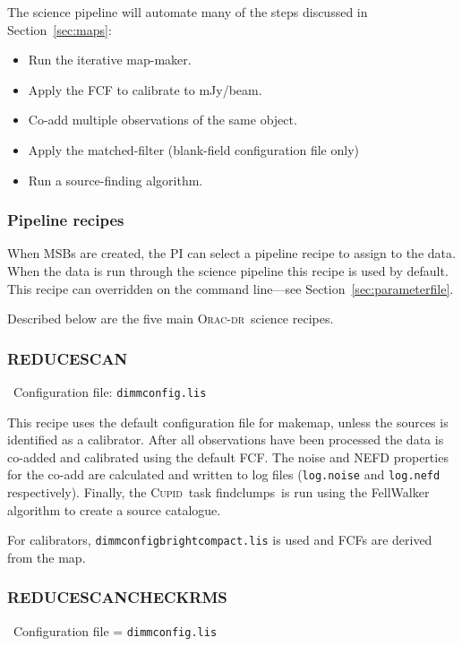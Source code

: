 \documentclass[twoside,11pt]{article}
\newcommand{\htmladdnormallink}[2]{#1}
\newcommand{\htmlref}[2]{#1}
\newcommand{\latexhtml}[2]{#1}
\newcommand{\xref}[3]{#1}
\newcommand{\xlabel}[1]{}
\renewcommand{\_}{\texttt{\symbol{95}}}
\newcommand{\cupid}{\xref{\textsc{Cupid}}{sun255}{}}
\newcommand{\oracdr}{\htmladdnormallink{\textsc{Orac-dr}}{http://www.oracdr.org/oracdr}}
\newcommand{\task}[1]{\textsf{#1}}
\newcommand{\makemap}{\xref{\task{makemap}}{sun258}{MAKEMAP}}
\newcommand{\findclumps}{\xref{\task{findclumps}}{sun255}{FINDCLUMPS}}
\newcommand{\cref}[3]{\latexhtml{#1~\ref{#2}}{\htmlref{#3}{#2}}}
\begin{document}
The science pipeline will automate many of the steps discussed in
\cref{Section}{sec:maps}{Reducing your data}:
\vspace{-0.3cm}
\begin{itemize}\itemsep-0.3em
\item Run the iterative map-maker.
\item Apply the FCF to calibrate to mJy/beam.
\item Co-add multiple observations of the same object.
\item Apply the matched-filter (blank-field configuration file only)
\item Run a source-finding algorithm.
\end{itemize}

\subsubsection{\xlabel{pl_output}Pipeline recipes}
\label{sec:recipes}

When MSBs are created, the PI can select a pipeline recipe to assign
to the data. When the data is run through the science pipeline this
recipe is used by default. This recipe can overridden on the command
line---see \cref{Section}{sec:parameterfile}{Changing the defaults}.

Described below are the five main \oracdr\ science recipes.

\subsubsection{\xlabel{extsources}REDUCE\_SCAN}
\vspace{-0.3cm}
\textbullet\ Configuration file: \texttt{dimmconfig.lis}

This recipe uses the default configuration file for \makemap, unless
the sources is identified as a calibrator. After all observations have
been processed the data is co-added and calibrated using the default
FCF.  The noise and NEFD properties for the co-add are calculated and
written to log files (\texttt{log.noise} and \texttt{log.nefd}
respectively). Finally, the \cupid\ task \findclumps\ is run using the
FellWalker algorithm to create a source catalogue.

For calibrators, \texttt{dimmconfig\_bright\_compact.lis} is used and
FCFs are derived from the map.


\subsubsection{\xlabel{extsources}REDUCE\_SCAN\_CHECKRMS}
\vspace{-0.3cm}
\textbullet\  Configuration file = \texttt{dimmconfig.lis}
\end{document}
